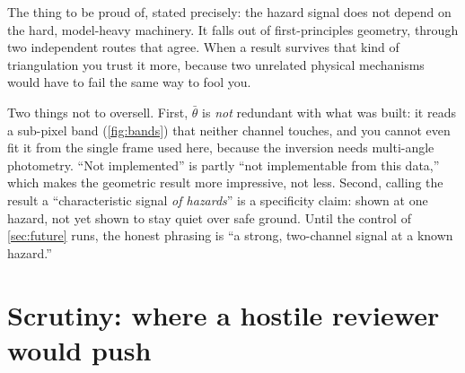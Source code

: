 \documentclass[11pt]{article}
\begin{document}
\begin{plainbox}
The thing to be proud of, stated precisely: the hazard signal does not depend on the
hard, model-heavy machinery. It falls out of first-principles geometry, through two
independent routes that agree. When a result survives that kind of triangulation you
trust it more, because two unrelated physical mechanisms would have to fail the same
way to fool you.
\end{plainbox}

\begin{limitbox}
Two things not to oversell. First, $\bar\theta$ is \emph{not} redundant with what was
built: it reads a sub-pixel band (\cref{fig:bands}) that neither channel touches, and
you cannot even fit it from the single frame used here, because the inversion needs
multi-angle photometry. ``Not implemented'' is partly ``not implementable from this
data,'' which makes the geometric result more impressive, not less. Second, calling
the result a ``characteristic signal \emph{of hazards}'' is a specificity claim:
shown at one hazard, not yet shown to stay quiet over safe ground. Until the control
of \cref{sec:future} runs, the honest phrasing is ``a strong, two-channel signal at a
known hazard.''
\end{limitbox}

\section{Scrutiny: where a hostile reviewer would push}
\end{document}
